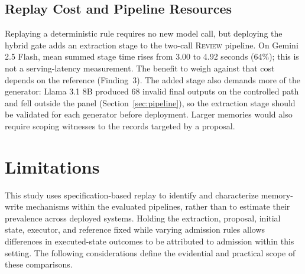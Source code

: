 \documentclass[acmsmall,review]{acmart}
\newcommand{\review}{\textsc{Review}}
\begin{document}
\subsection{Replay Cost and Pipeline Resources}
Replaying a deterministic rule requires no new model call, but deploying the hybrid gate adds an extraction stage to the two-call \review{} pipeline. On Gemini 2.5 Flash, mean summed stage time rises from 3.00 to 4.92 seconds (64\%); this is not a serving-latency measurement. The benefit to weigh against that cost depends on the reference (Finding~3). The added stage also demands more of the generator: Llama 3.1 8B produced 68 invalid final outputs on the controlled path and fell outside the panel (Section~\ref{sec:pipeline}), so the extraction stage should be validated for each generator before deployment. Larger memories would also require scoping witnesses to the records targeted by a proposal.

\section{Limitations}\label{sec:limitations}
This study uses specification-based replay to identify and characterize memory-write mechanisms within the evaluated pipelines, rather than to estimate their prevalence across deployed systems. Holding the extraction, proposal, initial state, executor, and reference fixed while varying admission rules allows differences in executed-state outcomes to be attributed to admission within this setting. The following considerations define the evidential and practical scope of these comparisons.
\end{document}
